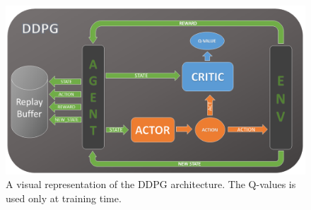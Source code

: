 \begin{figure}[H]
\centering
\includegraphics[width=1.\textwidth, height=.36\textheight]{pictures/ddpg_schema}
\caption{ A visual representation of the DDPG architecture. The Q-values is used only at training time.}
\end{figure}



